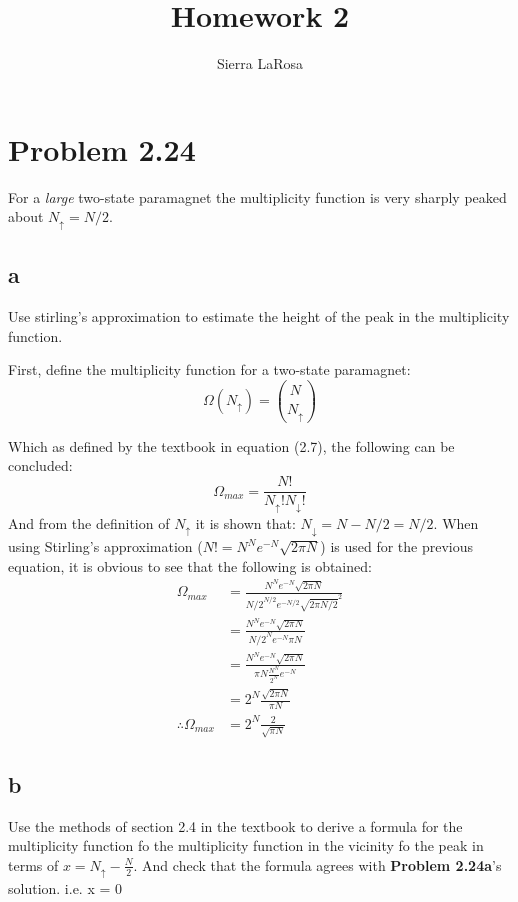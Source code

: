 \documentclass[a4paper,floatfix,nofootinbib]{article}
\title{Homework 2}
\author{Sierra LaRosa}
\begin{document}
\maketitle

\section*{Problem 2.24}
For a \textit{large} two-state paramagnet the multiplicity function is very sharply peaked about $N_{\uparrow} = N/2$.

\subsection*{a}
Use stirling's approximation to estimate the height of the peak in the multiplicity function.

First, define the multiplicity function for a two-state paramagnet:
\begin{equation*}
    \Omega(N_{\uparrow}) = \binom{N}{N_{\uparrow}}
\end{equation*}

Which as defined by the textbook in equation (2.7), the following can be concluded:
\begin{equation*}
    \Omega_{max} = \frac{N!}{N_{\uparrow} ! N_{\downarrow} ! } 
\end{equation*}
And from the definition of $N_{\uparrow}$ it is shown that: $N_{\downarrow} = N - N/2 = N/2$. When using Stirling's approximation ($N! = N^N e^{-N} \sqrt{2 \pi N} $) is used for the previous equation, it is obvious to see that the following is obtained:
\begin{align*}
    \Omega_{max} &= \frac{N^N e^{-N} \sqrt{2 \pi N}}{{{N/2}^{N/2} e^{-{N/2}} \sqrt{2 \pi {N/2}}}^2} \\
    &= \frac{N^N e^{-N} \sqrt{2 \pi N}}{{N/2}^N e^{-N} \pi N} \\
    &= \frac{N^N e^{-N} \sqrt{2 \pi N}}{\pi N \frac{N^N}{2^N} e^{-N} } \\
    &= 2^N \frac{ \sqrt{2 \pi N}}{\pi N } \\
    \therefore \Omega_{max} &= 2^N \frac{ 2 }{\sqrt{ \pi N }}
\end{align*}

\subsection*{b}
Use the methods of section 2.4 in the textbook to derive a formula for the multiplicity function fo the multiplicity function in the vicinity fo the peak in terms of $x = N_{\uparrow} - \frac{N}{2}$. And check that the formula agrees with \textbf{Problem 2.24a}'s solution. i.e. {x = 0} 
\end{document}
